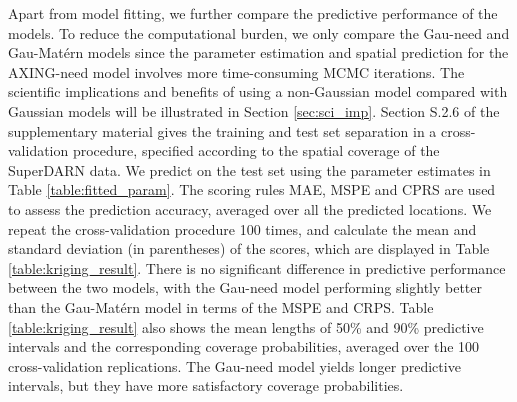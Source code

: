 \documentclass[aoas,preprint]{imsart}
\numberwithin{equation}{section}
\theoremstyle{plain}
\begin{document}
\begin{table}[htp]
\caption{Predictive performance of the Gau-need and Gau-Mat\'ern models for the small-scale component of the high-latitude ionospheric electrostatic potential at the first time point. All the scores are averaged over 100 cross-validation replications, where the standard deviations are shown in parentheses}
\begin{center}
\end{center}
\label{table:kriging_result}
\end{table}%

Apart from model fitting, we further compare the predictive performance of the models. %
To reduce the computational burden, we only compare the Gau-need and Gau-Mat\'ern models since the parameter estimation and spatial prediction for the AXING-need model involves more time-consuming MCMC iterations. 
The scientific implications and benefits of using a non-Gaussian model  compared with Gaussian models will be illustrated in Section \ref{sec:sci_imp}. 
Section S.2.6 of the supplementary material \citep{Fan-17-supp} gives the training and test set separation in a cross-validation procedure, specified according to the spatial coverage of the SuperDARN data. We predict on the test set using the parameter estimates in Table \ref{table:fitted_param}. The scoring rules MAE, MSPE and CPRS are used to assess the prediction accuracy, averaged over all the predicted locations. We repeat the cross-validation procedure 100 times, and calculate the mean and standard deviation (in parentheses) of the scores, which are displayed in Table \ref{table:kriging_result}. There is no significant difference in predictive performance between the two models, with the Gau-need model performing slightly better than the Gau-Mat\'ern model in terms of the MSPE and CRPS. Table \ref{table:kriging_result} also shows the mean lengths of 50\% and 90\% predictive intervals and the corresponding coverage probabilities, averaged over the 100 cross-validation replications. The Gau-need model yields longer predictive intervals, but they have more satisfactory coverage probabilities.
\end{document}
